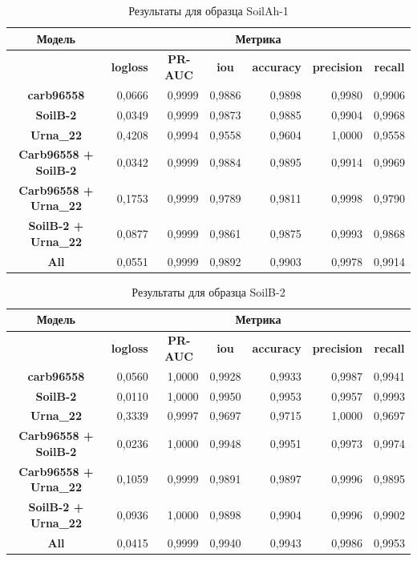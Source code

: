 \documentclass[14pt, a4paper, oneside, bold]{extarticle}
\begin{document}
\begin{table}[htbp]
\small
\begin{tabular}{|c|r|r|r|r|r|r|}
\hline
\textbf{Модель} & \multicolumn{ 6}{c|}{\textbf{Метрика}} \\ \hline
\textbf{} & \multicolumn{1}{c|}{\textbf{logloss}} & \multicolumn{1}{c|}{\textbf{PR-AUC}} & \multicolumn{1}{c|}{\textbf{iou}} & \multicolumn{1}{c|}{\textbf{accuracy}} & \multicolumn{1}{c|}{\textbf{precision}} & \multicolumn{1}{c|}{\textbf{recall}} \\ \hline
\textbf{carb96558} & 0,0666 & 0,9999 & 0,9886 & 0,9898 & 0,9980 & 0,9906 \\ \hline
\textbf{SoilB-2} & 0,0349 & 0,9999 & 0,9873 & 0,9885 & 0,9904 & 0,9968 \\ \hline
\textbf{Urna\_22} & 0,4208 & 0,9994 & 0,9558 & 0,9604 & 1,0000 & 0,9558 \\ \hline
\textbf{Carb96558 + SoilB-2} & 0,0342 & 0,9999 & 0,9884 & 0,9895 & 0,9914 & 0,9969 \\ \hline
\textbf{Carb96558 + Urna\_22} & 0,1753 & 0,9999 & 0,9789 & 0,9811 & 0,9998 & 0,9790 \\ \hline
\textbf{SoilB-2 + Urna\_22} & 0,0877 & 0,9999 & 0,9861 & 0,9875 & 0,9993 & 0,9868 \\ \hline
\textbf{All} & 0,0551 & 0,9999 & 0,9892 & 0,9903 & 0,9978 & 0,9914 \\ \hline
\end{tabular}
\caption{Результаты для образца SoilAh-1}
\label{SoilAh-1}
\end{table}


\begin{table}[htbp]
\small
\begin{tabular}{|c|r|r|r|r|r|r|}
\hline
\textbf{Модель} & \multicolumn{ 6}{c|}{\textbf{Метрика}} \\ \hline
\textbf{} & \multicolumn{1}{c|}{\textbf{logloss}} & \multicolumn{1}{c|}{\textbf{PR-AUC}} & \multicolumn{1}{c|}{\textbf{iou}} & \multicolumn{1}{c|}{\textbf{accuracy}} & \multicolumn{1}{c|}{\textbf{precision}} & \multicolumn{1}{c|}{\textbf{recall}} \\ \hline
\textbf{carb96558} & 0,0560 & 1,0000 & 0,9928 & 0,9933 & 0,9987 & 0,9941 \\ \hline
\textbf{SoilB-2} & 0,0110 & 1,0000 & 0,9950 & 0,9953 & 0,9957 & 0,9993 \\ \hline
\textbf{Urna\_22} & 0,3339 & 0,9997 & 0,9697 & 0,9715 & 1,0000 & 0,9697 \\ \hline
\textbf{Carb96558 + SoilB-2} & 0,0236 & 1,0000 & 0,9948 & 0,9951 & 0,9973 & 0,9974 \\ \hline
\textbf{Carb96558 + Urna\_22} & 0,1059 & 0,9999 & 0,9891 & 0,9897 & 0,9996 & 0,9895 \\ \hline
\textbf{SoilB-2 + Urna\_22} & 0,0936 & 1,0000 & 0,9898 & 0,9904 & 0,9996 & 0,9902 \\ \hline
\textbf{All} & 0,0415 & 0,9999 & 0,9940 & 0,9943 & 0,9986 & 0,9953 \\ \hline
\end{tabular}
\caption{Результаты для образца SoilB-2}
\label{SoilB-2}
\end{table}
\end{document}
